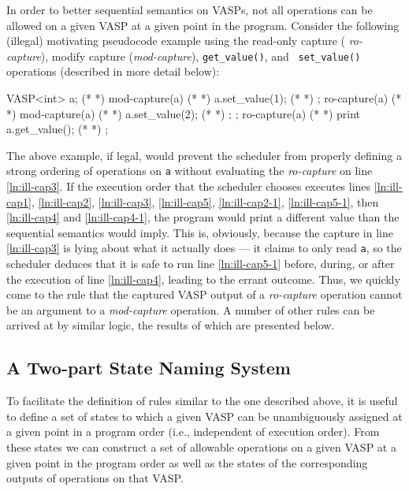In order to better sequential semantics on VASPs, not all operations can be
allowed on a given VASP at a given point in the program.  Consider the following
(illegal) motivating pseudocode example using the read-only capture ({\em
ro-capture}), modify capture ({\em mod-capture}), {\tt get\_value()}, and {\tt
set\_value()} operations (described in more detail below):
\begin{vaspPseudo}
VASP<int> a; (* \label{ln:ill-cap1} *)
mod-capture(a){  (* \label{ln:ill-cap2} *)
  a.set_value(1);  (* \label{ln:ill-cap2-1} *)
}; 
ro-capture(a){ (* \label{ln:ill-cap3} *)
  mod-capture(a){ (* \label{ln:ill-cap4} *)
    a.set_value(2); (* \label{ln:ill-cap4-1} *)
  }; 
};
ro-capture(a){ (* \label{ln:ill-cap5} *)
  print a.get_value(); (* \label{ln:ill-cap5-1} *)
}; 
\end{vaspPseudo}
The above example, if legal, would prevent the scheduler from properly defining
a strong ordering of operations on {\tt a} without evaluating the {\it
ro-capture} on line \ref{ln:ill-cap3}.  If the execution order that the
scheduler chooses executes lines \ref{ln:ill-cap1}, \ref{ln:ill-cap2},
\ref{ln:ill-cap3}, \ref{ln:ill-cap5}, \ref{ln:ill-cap2-1}, \ref{ln:ill-cap5-1},
then \ref{ln:ill-cap4} and \ref{ln:ill-cap4-1}, the program would print a
different value than the sequential semantics would imply.  This is, obviously,
because the capture in line \ref{ln:ill-cap3} is lying about what it actually
does --- it claims to only read {\tt a}, so the scheduler deduces that it is
safe to run line \ref{ln:ill-cap5-1} before, during, or after the execution of
line \ref{ln:ill-cap4}, leading to the errant outcome.  Thus, we quickly come to
the rule that the captured VASP output of a {\it ro-capture} operation cannot
be an argument to a {\it mod-capture} operation.  A number of other rules can be
arrived at by similar logic, the results of which are presented below.

\subsection{A Two-part State Naming System}
\label{subsec:twopart}

To facilitate the definition of rules similar to the one described above, it is
useful to define a set of states to which a given VASP can be unambiguously
assigned at a given point in a program order (i.e., independent of execution
order).  From these states we can construct a set of allowable operations on a
given VASP at a given point in the program order as well as the states of the
corresponding outputs of operations on that VASP.

